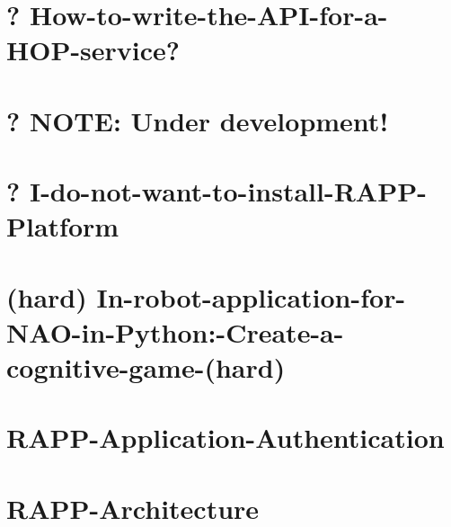 \documentclass[twoside]{book}
\begin{document}
\chapter{? How-\/to-\/write-\/the-\/\-A\-P\-I-\/for-\/a-\/\-H\-O\-P-\/service?}
\label{md_rapp-platform_8wiki_How-to-write-the-API-for-a-HOP-service}
\hypertarget{md_rapp-platform_8wiki_How-to-write-the-API-for-a-HOP-service}{}

\chapter{? N\-O\-T\-E\-: Under development!}
\label{md_rapp-platform_8wiki_I-do-not-even-want-to-try-the-easier-way_8-Do-you-have-something-up-and-running-to-test}
\hypertarget{md_rapp-platform_8wiki_I-do-not-even-want-to-try-the-easier-way_8-Do-you-have-something-up-and-running-to-test}{}

\chapter{? I-\/do-\/not-\/want-\/to-\/install-\/\-R\-A\-P\-P-\/\-Platform}
\label{md_rapp-platform_8wiki_I-do-not-want-to-install-RAPP-Platform_8-Is-there-an-easier-way-to-use-it}
\hypertarget{md_rapp-platform_8wiki_I-do-not-want-to-install-RAPP-Platform_8-Is-there-an-easier-way-to-use-it}{}

\chapter{(hard) In-\/robot-\/application-\/for-\/\-N\-A\-O-\/in-\/\-Python\-:-\/\-Create-\/a-\/cognitive-\/game-\/(hard)}
\label{md_rapp-platform_8wiki_In-robot-application-for-NAO-in-Python_1-Create-a-cognitive-game-}
\hypertarget{md_rapp-platform_8wiki_In-robot-application-for-NAO-in-Python_1-Create-a-cognitive-game-}{}

\chapter{R\-A\-P\-P-\/\-Application-\/\-Authentication}
\label{md_rapp-platform_8wiki_RAPP-Application-Authentication}
\hypertarget{md_rapp-platform_8wiki_RAPP-Application-Authentication}{}

\chapter{R\-A\-P\-P-\/\-Architecture}
\label{md_rapp-platform_8wiki_RAPP-Architecture}
\hypertarget{md_rapp-platform_8wiki_RAPP-Architecture}{}

\end{document}
